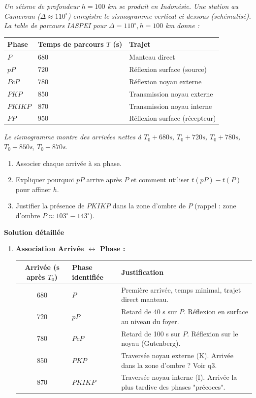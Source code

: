 \documentclass[11pt]{article}
\begin{document}
\begin{exoresolu}
\emph{Un séisme de profondeur $h = 100$ km se produit en Indonésie. Une station au Cameroun ($\Delta \approx 110^\circ$) enregistre le sismogramme vertical ci-dessous (schématisé). La table de parcours IASPEI pour $\Delta = 110^\circ, h=100$ km donne :}
\begin{center}
\begin{tabularx}{\linewidth}{|l|X|X|}\hline
\rowcolor{popblueL}
\textbf{Phase} & \textbf{Temps de parcours $T$ (s)} & \textbf{Trajet} \\ \hline
$P$ & 680 & Manteau direct \\ \hline
$pP$ & 720 & Réflexion surface (source) \\ \hline
$PcP$ & 780 & Réflexion noyau externe \\ \hline
$PKP$ & 850 & Transmission noyau externe \\ \hline
$PKIKP$ & 870 & Transmission noyau interne \\ \hline
$PP$ & 950 & Réflexion surface (récepteur) \\ \hline
\end{tabularx}
\end{center}
\emph{Le sismogramme montre des arrivées nettes à $T_0+680$s, $T_0+720$s, $T_0+780$s, $T_0+850$s, $T_0+870$s.}
\begin{enumerate}
    \item Associer chaque arrivée à sa phase.
    \item Expliquer pourquoi $pP$ arrive après $P$ et comment utiliser $t(pP)-t(P)$ pour affiner $h$.
    \item Justifier la présence de $PKIKP$ dans la zone d'ombre de $P$ (rappel : zone d'ombre $P \approx 103^\circ-143^\circ$).
\end{enumerate}
\tcblower
\textbf{Solution détaillée}
\begin{enumerate}
    \item \textbf{Association Arrivée $\leftrightarrow$ Phase :}
    \begin{center}
    \begin{tabularx}{\linewidth}{|c|X|X|}\hline
    \rowcolor{popblueL}
    \textbf{Arrivée (s après $T_0$)} & \textbf{Phase identifiée} & \textbf{Justification} \\ \hline
    680 & $P$ & Première arrivée, temps minimal, trajet direct manteau. \\ \hline
    720 & $pP$ & Retard de 40 s sur $P$. Réflexion en surface au niveau du foyer. \\ \hline
    780 & $PcP$ & Retard de 100 s sur $P$. Réflexion sur le noyau (Gutenberg). \\ \hline
    850 & $PKP$ & Traversée noyau externe (K). Arrivée dans la zone d'ombre ? Voir q3. \\ \hline
    870 & $PKIKP$ & Traversée noyau interne (I). Arrivée la plus tardive des phases "précoces". \\ \hline
    \end{tabularx}
    \end{center}
    

\end{enumerate}
\end{exoresolu}
\end{document}
